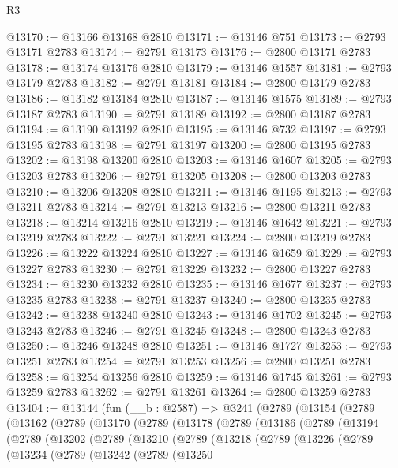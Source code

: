 \begin{lexlean}{R3}
\begin{coremodule}
@13170 := @13166 @13168 @2810
@13171 := @13146 @751
@13173 := @2793 @13171 @2783
@13174 := @2791 @13173
@13176 := @2800 @13171 @2783
@13178 := @13174 @13176 @2810
@13179 := @13146 @1557
@13181 := @2793 @13179 @2783
@13182 := @2791 @13181
@13184 := @2800 @13179 @2783
@13186 := @13182 @13184 @2810
@13187 := @13146 @1575
@13189 := @2793 @13187 @2783
@13190 := @2791 @13189
@13192 := @2800 @13187 @2783
@13194 := @13190 @13192 @2810
@13195 := @13146 @732
@13197 := @2793 @13195 @2783
@13198 := @2791 @13197
@13200 := @2800 @13195 @2783
@13202 := @13198 @13200 @2810
@13203 := @13146 @1607
@13205 := @2793 @13203 @2783
@13206 := @2791 @13205
@13208 := @2800 @13203 @2783
@13210 := @13206 @13208 @2810
@13211 := @13146 @1195
@13213 := @2793 @13211 @2783
@13214 := @2791 @13213
@13216 := @2800 @13211 @2783
@13218 := @13214 @13216 @2810
@13219 := @13146 @1642
@13221 := @2793 @13219 @2783
@13222 := @2791 @13221
@13224 := @2800 @13219 @2783
@13226 := @13222 @13224 @2810
@13227 := @13146 @1659
@13229 := @2793 @13227 @2783
@13230 := @2791 @13229
@13232 := @2800 @13227 @2783
@13234 := @13230 @13232 @2810
@13235 := @13146 @1677
@13237 := @2793 @13235 @2783
@13238 := @2791 @13237
@13240 := @2800 @13235 @2783
@13242 := @13238 @13240 @2810
@13243 := @13146 @1702
@13245 := @2793 @13243 @2783
@13246 := @2791 @13245
@13248 := @2800 @13243 @2783
@13250 := @13246 @13248 @2810
@13251 := @13146 @1727
@13253 := @2793 @13251 @2783
@13254 := @2791 @13253
@13256 := @2800 @13251 @2783
@13258 := @13254 @13256 @2810
@13259 := @13146 @1745
@13261 := @2793 @13259 @2783
@13262 := @2791 @13261
@13264 := @2800 @13259 @2783
@13404 := @13144
    (fun (__b : @2587) =>
    @3241
      (@2789
        (@13154
          (@2789
            (@13162
              (@2789
                (@13170
                  (@2789
                    (@13178
                      (@2789
                        (@13186
                          (@2789
                            (@13194
                              (@2789
                                (@13202
                                  (@2789
                                    (@13210
                                      (@2789
                                        (@13218
                                          (@2789
                                            (@13226
                                              (@2789
                                                (@13234
                                                  (@2789
                                                    (@13242
                                                      (@2789
                                                        (@13250

\end{coremodule}
\end{lexlean}
